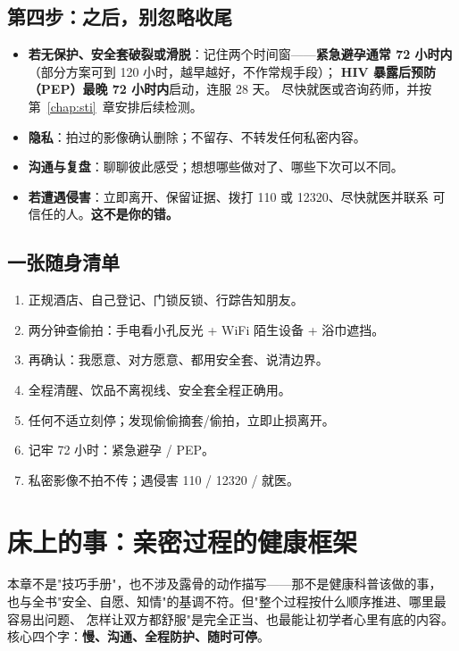 \documentclass[12pt,UTF8,openany]{ctexbook}
\begin{document}
\section{第四步：之后，别忽略收尾}

\begin{itemize}[leftmargin=2em]
  \item \textbf{若无保护、安全套破裂或滑脱}：记住两个时间窗——\textbf{紧急避孕通常 72 小时内}
        （部分方案可到 120 小时，越早越好，不作常规手段）；
        \textbf{HIV 暴露后预防（PEP）最晚 72 小时内}启动，连服 28 天。
        尽快就医或咨询药师，并按第~\ref{chap:sti}~章安排后续检测。
  \item \textbf{隐私}：拍过的影像确认删除；不留存、不转发任何私密内容。
  \item \textbf{沟通与复盘}：聊聊彼此感受；想想哪些做对了、哪些下次可以不同。
  \item \textbf{若遭遇侵害}：立即离开、保留证据、拨打 110 或 12320、尽快就医并联系
        可信任的人。\textbf{这不是你的错。}
\end{itemize}

\section{一张随身清单}

\begin{enumerate}[leftmargin=2em,itemsep=0.3em]
  \item 正规酒店、自己登记、门锁反锁、行踪告知朋友。
  \item 两分钟查偷拍：手电看小孔反光 + WiFi 陌生设备 + 浴巾遮挡。
  \item 再确认：我愿意、对方愿意、都用安全套、说清边界。
  \item 全程清醒、饮品不离视线、安全套全程正确用。
  \item 任何不适立刻停；发现偷偷摘套/偷拍，立即止损离开。
  \item 记牢 72 小时：紧急避孕 / PEP。
  \item 私密影像不拍不传；遇侵害 110 / 12320 / 就医。
\end{enumerate}

\chapter{床上的事：亲密过程的健康框架}
\label{chap:intimacy}

本章不是"技巧手册"，也不涉及露骨的动作描写——那不是健康科普该做的事，
也与全书"安全、自愿、知情"的基调不符。但"整个过程按什么顺序推进、哪里最容易出问题、
怎样让双方都舒服"是完全正当、也最能让初学者心里有底的内容。
核心四个字：\textbf{慢、沟通、全程防护、随时可停}。
\end{document}
